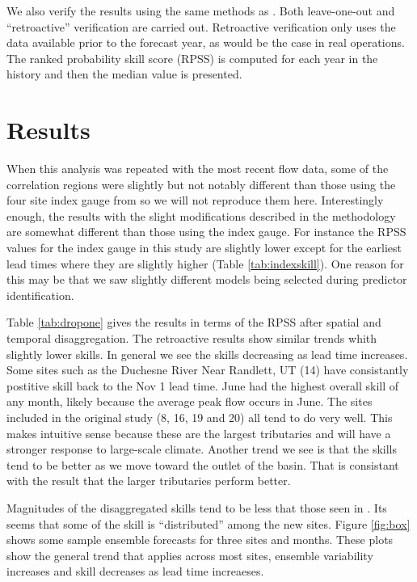 \documentclass[11pt]{article}
\begin{document}
We also verify the results using the same methods as \cite{Bracken:2010p2682}. Both leave-one-out and ``retroactive'' verification are carried out.  Retroactive verification only uses the data available prior to the forecast year, as would be the case in real operations.  The ranked probability skill score (RPSS) \citep{Wilks:1995p3976} is computed for each year in the history and then the median value is presented. 

\section{Results}

When this analysis was repeated with the most recent flow data, some of the correlation regions were slightly but not notably different than those using the four site index gauge from \cite{Bracken:2010p2682} so we will not reproduce them here.  Interestingly enough, the results with the slight modifications described in the methodology are somewhat different than those using the index gauge. For instance the RPSS values for the index gauge in this study are slightly lower except for the earliest lead times where they are slightly higher (Table \ref{tab:indexskill}).  One reason for this may be that we saw slightly different models being selected during predictor identification. 

Table \ref{tab:dropone} gives the results in terms of the RPSS after spatial and temporal disaggregation. The retroactive results show similar trends whith slightly lower skills. In general we see the skills decreasing as lead time increases.  Some sites such as the Duchesne River Near Randlett, UT (14) have consistantly postitive skill back to the Nov 1 lead time.  June had the highest overall skill of any month, likely because the average peak flow occurs in June. The sites included in the original study (8, 16, 19 and 20) all tend to do very well.  This makes intuitive sense because these are the largest tributaries and will have a stronger response to large-scale climate.  Another trend we see is that the skills tend to be better as we move toward the outlet of the basin. That is consistant with the result that the larger tributaries perform better. 

Magnitudes of the disaggregated skills tend to be less that those seen in \cite{Bracken:2010p2682}.  Its seems that some of the skill is ``distributed'' among the new sites. Figure \ref{fig:box} shows some sample ensemble forecasts for three sites and months.  These plots show the general trend that applies across most sites, ensemble variability increases and skill decreases as lead time increaeses. 
\end{document}
